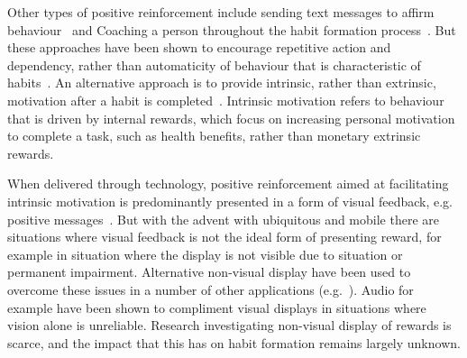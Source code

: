 \documentclass{scaffold/sigchi}
\begin{document}
%

Other types of positive reinforcement include sending text messages to affirm behaviour~\cite{chi_crowd_designed_motivation} and Coaching a person throughout the habit formation process~\cite{coaching_not_that_good}. But these approaches have been shown to encourage repetitive action and dependency, rather than automaticity of behaviour that is characteristic of habits~\cite{habits_as_automaticity_not_frequency_gardner}.
%
An alternative approach is to provide intrinsic, rather than extrinsic, motivation after a habit is completed~\cite{article_a_self_efficacy, article_meta_analytic_review_intrinsic_motivation}. Intrinsic motivation refers to behaviour that is driven by internal rewards, which focus on increasing personal motivation to complete a task, such as health benefits, rather than monetary extrinsic rewards.

When delivered through technology, positive reinforcement aimed at facilitating intrinsic motivation is predominantly  presented in a form of visual feedback, e.g. positive messages~\cite{comparison_of_auditory_visual_feedback, visual_mode_better, article_realtime_feedback_improving_medication_taking}. 
%
But with the advent with ubiquitous and mobile there are situations where visual feedback is not the ideal form of presenting reward, for example in situation where the display is not visible due to situation or permanent impairment. Alternative non-visual display have been used to overcome these issues in a number of other applications (e.g.~\cite{burke2006comparing, vazquez2012auditory, chi_oussama_tap_the_shapetones}). Audio for example have been shown to compliment visual displays in situations where vision alone is unreliable. Research investigating non-visual display of rewards is scarce, and the impact that this has on habit formation remains largely unknown.


%
%
\end{document}
